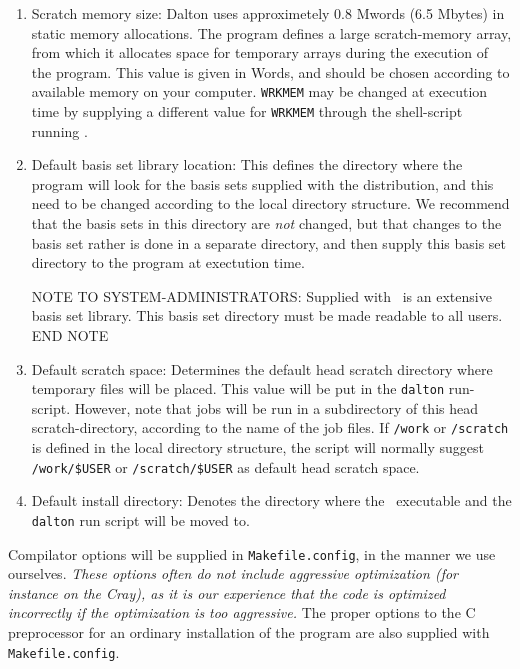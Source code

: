 \begin{enumerate}
\item Scratch memory size: Dalton uses
approximetely 0.8 Mwords (6.5 Mbytes) 
in static memory allocations. The program defines a large scratch-memory
array, from which it allocates space for temporary arrays
during the execution of the program. This value is given in Words, and
should be chosen according to available memory on your computer.
\verb|WRKMEM| may be changed at execution time by supplying a
different value for \verb|WRKMEM| through the shell-script running
\siraba .

\item Default basis set library location:
This defines the directory 
where the program will look for the basis sets supplied with the
distribution, and this need to be changed according 
to the local directory structure. We recommend that the basis sets in
this directory are {\em not} changed, but that changes to the basis
set rather is done in a separate directory, and then supply this basis
set directory to the program at exectution time.

{\sc NOTE TO SYSTEM-ADMINISTRATORS:} Supplied with \siraba\ is an
extensive basis set library. This basis set directory must be made
readable to all users. {\sc END NOTE}

\item Default scratch space: Determines the
default head scratch 
directory where temporary files will be placed. This value will be put
in the \verb|dalton| run-script. However, note that jobs will be run in
a subdirectory of this head scratch-directory, according to the name
of the job files. If \verb|/work| or \verb|/scratch| is defined in the
local directory structure, the script will normally suggest
\verb|/work/$USER| or  \verb|/scratch/$USER| as default head scratch space.

\item Default install directory: Denotes the directory where the \siraba\
executable and the \verb|dalton| run script will be moved to.
\end{enumerate}

Compilator options will be supplied in \verb|Makefile.config|, in the manner
we use ourselves. {\em These options often do not include aggressive
optimization\index{optimization (f77)} (for instance on the Cray), as
it is our experience that 
the code is optimized incorrectly if the optimization is too
aggressive.} The proper options to the C preprocessor for an ordinary
installation of the program are also supplied with \verb|Makefile.config|.

